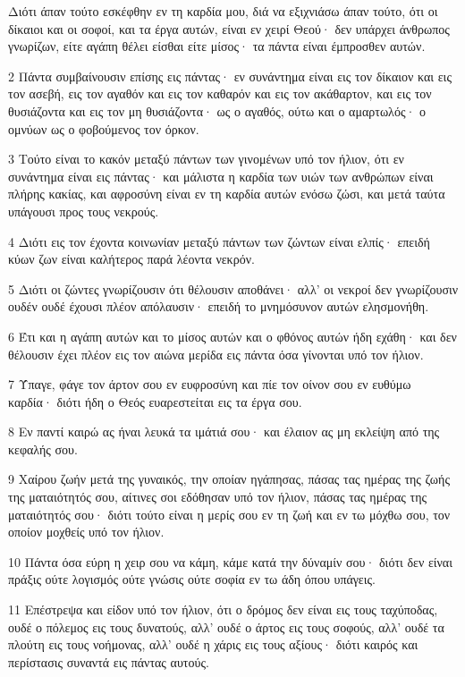 \par Διότι άπαν τούτο εσκέφθην εν τη καρδία μου, διά να εξιχνιάσω άπαν τούτο, ότι οι δίκαιοι και οι σοφοί, και τα έργα αυτών, είναι εν χειρί Θεού· δεν υπάρχει άνθρωπος γνωρίζων, είτε αγάπη θέλει είσθαι είτε μίσος· τα πάντα είναι έμπροσθεν αυτών.
\par 2 Πάντα συμβαίνουσιν επίσης εις πάντας· εν συνάντημα είναι εις τον δίκαιον και εις τον ασεβή, εις τον αγαθόν και εις τον καθαρόν και εις τον ακάθαρτον, και εις τον θυσιάζοντα και εις τον μη θυσιάζοντα· ως ο αγαθός, ούτω και ο αμαρτωλός· ο ομνύων ως ο φοβούμενος τον όρκον.
\par 3 Τούτο είναι το κακόν μεταξύ πάντων των γινομένων υπό τον ήλιον, ότι εν συνάντημα είναι εις πάντας· και μάλιστα η καρδία των υιών των ανθρώπων είναι πλήρης κακίας, και αφροσύνη είναι εν τη καρδία αυτών ενόσω ζώσι, και μετά ταύτα υπάγουσι προς τους νεκρούς.
\par 4 Διότι εις τον έχοντα κοινωνίαν μεταξύ πάντων των ζώντων είναι ελπίς· επειδή κύων ζων είναι καλήτερος παρά λέοντα νεκρόν.
\par 5 Διότι οι ζώντες γνωρίζουσιν ότι θέλουσιν αποθάνει· αλλ' οι νεκροί δεν γνωρίζουσιν ουδέν ουδέ έχουσι πλέον απόλαυσιν· επειδή το μνημόσυνον αυτών ελησμονήθη.
\par 6 Έτι και η αγάπη αυτών και το μίσος αυτών και ο φθόνος αυτών ήδη εχάθη· και δεν θέλουσιν έχει πλέον εις τον αιώνα μερίδα εις πάντα όσα γίνονται υπό τον ήλιον.
\par 7 Ύπαγε, φάγε τον άρτον σου εν ευφροσύνη και πίε τον οίνον σου εν ευθύμω καρδία· διότι ήδη ο Θεός ευαρεστείται εις τα έργα σου.
\par 8 Εν παντί καιρώ ας ήναι λευκά τα ιμάτιά σου· και έλαιον ας μη εκλείψη από της κεφαλής σου.
\par 9 Χαίρου ζωήν μετά της γυναικός, την οποίαν ηγάπησας, πάσας τας ημέρας της ζωής της ματαιότητός σου, αίτινες σοι εδόθησαν υπό τον ήλιον, πάσας τας ημέρας της ματαιότητός σου· διότι τούτο είναι η μερίς σου εν τη ζωή και εν τω μόχθω σου, τον οποίον μοχθείς υπό τον ήλιον.
\par 10 Πάντα όσα εύρη η χειρ σου να κάμη, κάμε κατά την δύναμίν σου· διότι δεν είναι πράξις ούτε λογισμός ούτε γνώσις ούτε σοφία εν τω άδη όπου υπάγεις.
\par 11 Επέστρεψα και είδον υπό τον ήλιον, ότι ο δρόμος δεν είναι εις τους ταχύποδας, ουδέ ο πόλεμος εις τους δυνατούς, αλλ' ουδέ ο άρτος εις τους σοφούς, αλλ' ουδέ τα πλούτη εις τους νοήμονας, αλλ' ουδέ η χάρις εις τους αξίους· διότι καιρός και περίστασις συναντά εις πάντας αυτούς.
